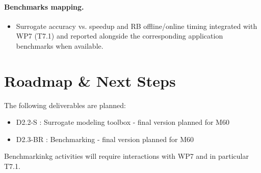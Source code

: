 \paragraph{Benchmarks mapping.}
\begin{itemize}
  \item Surrogate accuracy vs. speedup and RB offline/online timing integrated with WP7 (T7.1) and reported alongside the corresponding application benchmarks when available.
\end{itemize}

\section{Roadmap \& Next Steps}

The following deliverables are planned: 
\begin{itemize}
\item D2.2-S : Surrogate modeling toolbox - final version planned for M60
\item D2.3-BR : Benchmarking - final version planned for M60
\end{itemize}

Benchmarkinkg activities will require interactions with WP7 and in particular T7.1.
